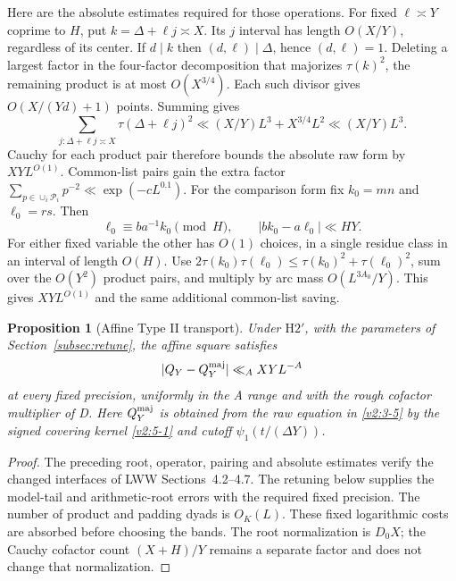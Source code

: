 \documentclass[11pt]{article}
\newtheorem{proposition}[theorem]{Proposition}
\theoremstyle{definition}
\theoremstyle{remark}
\numberwithin{equation}{section}
\begin{document}
Here are the absolute estimates required for those operations.
For fixed $\ell\asymp Y$ coprime to $H$, put
$k=\Delta+\ell j\asymp X$. Its $j$ interval has length
$O(X/Y)$, regardless of its center. If $d\mid k$ then
$(d,\ell)\mid\Delta$, hence $(d,\ell)=1$.
Deleting a largest factor in the four-factor decomposition that
majorizes $\tau(k)^2$, the remaining product is at most
$O(X^{3/4})$. Each such divisor gives
$O(X/(Yd)+1)$ points. Summing gives
\begin{equation}\label{eq:affine-divisor-square}
 \sum_{j:\Delta+\ell j\asymp X}\tau(\Delta+\ell j)^2
 \ll (X/Y)L^3+X^{3/4}L^2\ll(X/Y)L^3.
\end{equation}
Cauchy for each product pair therefore bounds the absolute raw
form by $XYL^{O(1)}$. Common-list pairs gain the extra factor
$\sum_{p\in\cup_i\mathcal P_i}p^{-2}\ll\exp(-cL^{0.1})$.
For the comparison form fix $k_0=mn$ and $\ell_0=rs$. Then
\begin{equation}\label{eq:affine-comparison}
 \ell_0\equiv ba^{-1}k_0\pmod H,\qquad
 |bk_0-a\ell_0|\ll HY.
\end{equation}
For either fixed variable the other has $O(1)$ choices, in a
single residue class in an interval of length $O(H)$.
Use $2\tau(k_0)\tau(\ell_0)\le\tau(k_0)^2+\tau(\ell_0)^2$,
sum over the $O(Y^2)$ product pairs, and multiply by arc mass
$O(L^{3A_0}/Y)$. This gives $XYL^{O(1)}$ and the same additional
common-list saving.

\begin{proposition}[Affine Type II transport]\label{prop:affine-II}
Under $\mathrm H2'$, with the parameters of
Section~\ref{subsec:retune}, the affine square satisfies
\begin{equation}\label{v2:4-6}
 |Q_Y-Q_Y^{\rm maj}|\ll_A XYL^{-A}
\end{equation}
at every fixed precision, uniformly in the A range and with the
rough cofactor multiplier of D. Here $Q_Y^{\rm maj}$ is obtained
from the raw equation in \eqref{v2:3-5} by the signed covering
kernel \eqref{v2:5-1} and cutoff $\psi_1(t/(\Delta Y))$.
\end{proposition}
\begin{proof}
The preceding root, operator, pairing and absolute estimates
verify the changed interfaces of LWW Sections~4.2--4.7.
The retuning below supplies the model-tail and arithmetic-root
errors with the required fixed precision. The number of product
and padding dyads is $O_K(L)$. These fixed logarithmic costs are
absorbed before choosing the bands. The root normalization is
$D_0X$; the Cauchy cofactor count $(X+H)/Y$ remains a separate
factor and does not change that normalization.
\end{proof}
\end{document}
